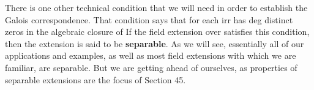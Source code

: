 \documentclass[11pt,oneside]{article}
\begin{document}
\begin{BookBody}
There is one other technical condition that we will need in order to establish the Galois correspondence. That condition says that for each  irr has deg distinct zeros in the algebraic closure of  If the field extension  over  satisfies this condition, then the extension is said to be\textbf{ separable}. As we will see, essentially all of our applications and examples, as well as most field extensions with which we are familiar, are separable. But we are getting ahead of ourselves, as properties of separable extensions are the focus of Section 45.

\end{BookBody}

\BookNarrativefalse
\end{document}
